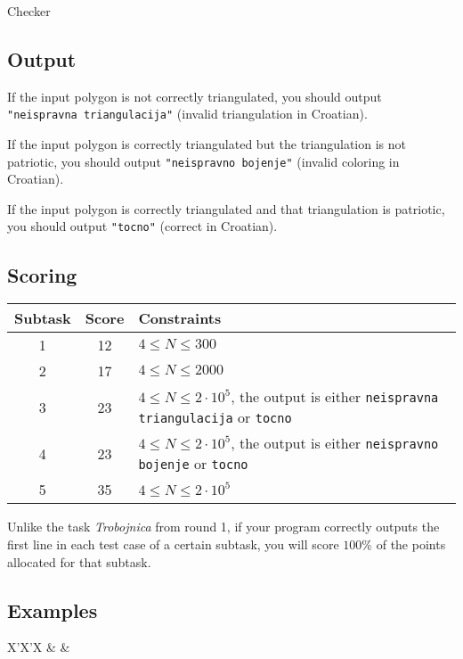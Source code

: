 \begin{statement}[
  problempoints=110,
  timelimit=3 seconds,
  memorylimit=512 MiB,
]{Checker}
\subsection*{Output}
If the input polygon is not correctly triangulated, you should output
\texttt{"neispravna triangulacija"} (invalid triangulation in Croatian).

If the input polygon is correctly triangulated but the triangulation is
not patriotic, you should output \texttt{"neispravno bojenje"} (invalid
coloring in Croatian).

If the input polygon is correctly triangulated and that triangulation is
patriotic, you should output \texttt{"tocno"} (correct in Croatian).

\subsection*{Scoring}
{\renewcommand{\arraystretch}{1.4}
  \setlength{\tabcolsep}{6pt}
  \begin{tabular}{ccl}
 Subtask & Score & Constraints \\ \midrule
  1 & 12 & $4 \le N \le 300$ \\
  2 & 17 & $4 \le N \le 2000$ \\
  3 & 23 & $4 \le N \le 2\cdot10^5$, the output is either \texttt{neispravna triangulacija} or \texttt{tocno} \\
  4 & 23 & $4 \le N \le 2\cdot10^5$, the output is either \texttt{neispravno bojenje} or \texttt{tocno} \\
  5 & 35 & $4 \le N \le 2\cdot10^5$
\end{tabular}}

Unlike the task \textit{Trobojnica} from round 1, if your program correctly
outputs the first line in each test case of a certain subtask, you will score
$100\%$ of the points allocated for that subtask.

\subsection*{Examples}
\begin{tabularx}{\textwidth}{X'X'X}
 &
 &
\end{tabularx}


\end{statement}
